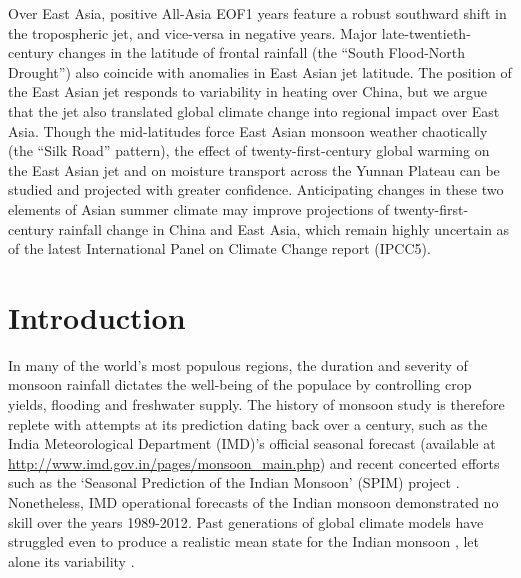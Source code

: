 Over East Asia, positive All-Asia EOF1 years feature a robust southward shift in the tropospheric jet, and vice-versa in negative years. Major late-twentieth-century changes in the latitude of frontal rainfall (the ``South Flood-North Drought'') also coincide with anomalies in East Asian jet latitude. The position of the East Asian jet responds to variability in heating over China, but we argue that the jet also translated global climate change into regional impact over East Asia. Though the mid-latitudes force East Asian monsoon weather chaotically (the ``Silk Road'' pattern), the effect of twenty-first-century global warming on the East Asian jet and on moisture transport across the Yunnan Plateau can be studied and projected with greater confidence. Anticipating changes in these two elements of Asian summer climate may improve projections of twenty-first-century rainfall change in China and East Asia, which remain highly uncertain as of the latest International Panel on Climate Change report (IPCC5).

\section{Introduction}

	In many of the world's most populous regions, the duration and severity of monsoon rainfall dictates the well-being of the populace by controlling crop yields, flooding and freshwater supply. The history of monsoon study is therefore replete with attempts at its prediction dating back over a century, such as the India Meteorological Department (IMD)'s official seasonal forecast (available at \url{http://www.imd.gov.in/pages/monsoon_main.php}) and recent concerted efforts such as the `Seasonal Prediction of the Indian Monsoon' (SPIM) project \citep{Gadgil2011}. Nonetheless, IMD operational forecasts of the Indian monsoon demonstrated no skill over the years 1989-2012\cite{Wang2015}. Past generations of global climate models have struggled even to produce a realistic mean state for the Indian monsoon \citep{Gadgil2003}, let alone its variability \citep{KrishnaKumar2005}. 
	
